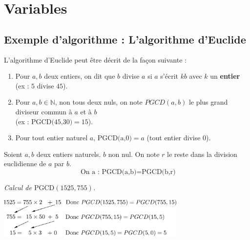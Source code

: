 \documentclass[10pt,fleqn]{article} %
\begin{document}




\section{Variables}
\subsection{Exemple d'algorithme : L'algorithme d'Euclide}

L'algorithme d'Euclide peut être décrit de la façon suivante : 
\begin{enumerate}
\item Pour $a,b$ deux entiers, on dit que $b$ divise $a$ si $a$ s'écrit $kb$ avec $k$ un \textbf{entier} (ex : $5$ divise $45$).
\item Pour $a,b \in \mathbb{N}$, non tous deux nuls, on note $PGCD(a,b)$ le plus grand diviseur commun à $a$ et à $b$\\
 (ex : $\text{PGCD(45,30)}=15$).
\item Pour tout entier naturel $a$, $\text{PGCD(a,0)}=a$ (tout entier divise $0$).
\end{enumerate}


\begin{proposition}
Soient $a,b$ deux entiers naturels. $b$ non nul. On note $r$ le reste dans la division euclidienne de $a$ par $b$.\\
$$\text{ On a : }\text{PGCD(a,b)}=\text{PGCD(b,r)}$$
\end{proposition}
\begin{exemple}
\textit{Calcul de $\text{PGCD}(1525,755)$.}
\begin{center}
\includegraphics[width=0.7\textwidth]{images/euclide.png}
\end{center}
\end{exemple}
\end{document}
